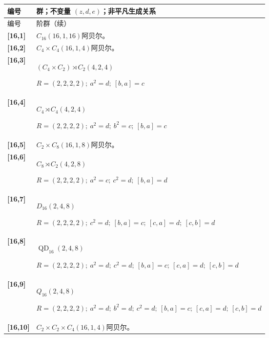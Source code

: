 \documentclass[UTF8,fontset=fandol,11pt,a4paper]{ctexart}
\begin{document}
\begin{longtable}{@{}p{17mm}>{\raggedright\arraybackslash}p{141mm}@{}}

\toprule 编号 & 群；不变量 $(z,d,e)$；非平凡生成关系\\\midrule\endfirsthead

\toprule 编号 & 16 阶群（续）\\\midrule\endhead\bottomrule\endfoot

\textbf{[16,1]} & $C_{16}$\quad $(16,1,16)$\quad 阿贝尔。\\[3pt]

\textbf{[16,2]} & $C_{4}\times C_{4}$\quad $(16,1,4)$\quad 阿贝尔。\\[3pt]

\textbf{[16,3]} & $(C_{4}\times C_{2})\rtimes C_{2}$\quad $(4,2,4)$\par\(R=(2,2,2,2);\allowbreak\ a^{2}=d;\allowbreak\ [b,a]=c\)\\[3pt]

\textbf{[16,4]} & $C_{4}\rtimes C_{4}$\quad $(4,2,4)$\par\(R=(2,2,2,2);\allowbreak\ a^{2}=d;\allowbreak\ b^{2}=c;\allowbreak\ [b,a]=c\)\\[3pt]

\textbf{[16,5]} & $C_{2}\times C_{8}$\quad $(16,1,8)$\quad 阿贝尔。\\[3pt]

\textbf{[16,6]} & $C_{8}\rtimes C_{2}$\quad $(4,2,8)$\par\(R=(2,2,2,2);\allowbreak\ a^{2}=c;\allowbreak\ c^{2}=d;\allowbreak\ [b,a]=d\)\\[3pt]

\textbf{[16,7]} & $D_{16}$\quad $(2,4,8)$\par\(R=(2,2,2,2);\allowbreak\ c^{2}=d;\allowbreak\ [b,a]=c;\allowbreak\ [c,a]=d;\allowbreak\ [c,b]=d\)\\[3pt]

\textbf{[16,8]} & $\operatorname{QD}_{16}$\quad $(2,4,8)$\par\(R=(2,2,2,2);\allowbreak\ a^{2}=d;\allowbreak\ c^{2}=d;\allowbreak\ [b,a]=c;\allowbreak\ [c,a]=d;\allowbreak\ [c,b]=d\)\\[3pt]

\textbf{[16,9]} & $Q_{16}$\quad $(2,4,8)$\par\(R=(2,2,2,2);\allowbreak\ a^{2}=d;\allowbreak\ b^{2}=d;\allowbreak\ c^{2}=d;\allowbreak\ [b,a]=c;\allowbreak\ [c,a]=d;\allowbreak\ [c,b]=d\)\\[3pt]

\textbf{[16,10]} & $C_{2}\times C_{2}\times C_{4}$\quad $(16,1,4)$\quad 阿贝尔。\\[3pt]


\end{longtable}
\end{document}
